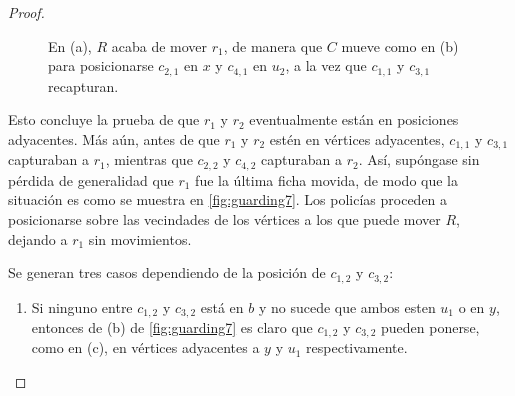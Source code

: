\begin{proof}
\begin{enumerate}
\begin{enumerate}
\begin{figure}[ht!]
\begin{tcbitemize}
{\begin{tikzpicture}
                                \end{tikzpicture}
                            }
                \end{tcbitemize}
                \captionsetup{font=footnotesize}
                \caption{En (a), $R$ acaba de mover $r_1$, de manera que $C$
                mueve como en (b) para posicionarse $c_{2,1}$ en $x$ y $c_{4,1}$
                en $u_2$, a la vez que $c_{1,1}$ y $c_{3,1}$ recapturan.}
                \label{fig:guarding4}
            \end{figure}

        \end{enumerate}
        
    \end{enumerate}

    Esto concluye la prueba de que $r_1$ y $r_2$ eventualmente est\'an en
    posiciones adyacentes. M\'as a\'un, antes de que $r_1$ y $r_2$ est\'en en
    v\'ertices adyacentes, $c_{1,1}$ y $c_{3,1}$ capturaban a $r_1$, mientras
    que $c_{2,2}$ y $c_{4,2}$ capturaban a $r_2$. As\'i, sup\'ongase sin
    p\'erdida de generalidad que $r_1$ fue la \'ultima ficha movida, de modo que
    la situaci\'on es como se muestra en \cref{fig:guarding7}. Los polic\'ias
    proceden a posicionarse sobre las vecindades de los v\'ertices a los que
    puede mover $R$, dejando a $r_1$ sin movimientos. 
    
    Se generan tres casos dependiendo de la posici\'on de $c_{1,2}$ y $c_{3,2}$:

    \begin{enumerate}
        \item Si ninguno entre $c_{1,2}$ y $c_{3,2}$ est\'a en $b$ y no sucede
        que ambos esten $u_1$ o en $y$, entonces de (b) de \cref{fig:guarding7}
        es claro que $c_{1,2}$ y $c_{3,2}$ pueden ponerse, como en (c), en
        v\'ertices adyacentes a $y$ y $u_1$ respectivamente.


\end{enumerate}
\end{proof}
